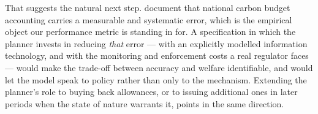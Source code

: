 \documentclass[a4paper,fleqn]{cas-dc}
\begin{document}
That suggests the natural next step. \citet{andres_new_2014} document that national carbon budget accounting carries a measurable and systematic error, which is the empirical object our performance metric is standing in for. A specification in which the planner invests in reducing \emph{that} error --- with an explicitly modelled information technology, and with the monitoring and enforcement costs a real regulator faces --- would make the trade-off between accuracy and welfare identifiable, and would let the model speak to policy rather than only to the mechanism. Extending the planner's role to buying back allowances, or to issuing additional ones in later periods when the state of nature warrants it, points in the same direction.








\end{document}
